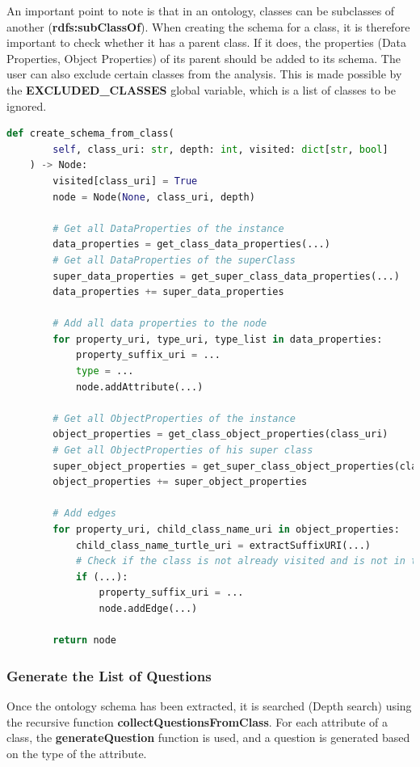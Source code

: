 An important point to note is that in an ontology, classes can be subclasses of another (\textbf{rdfs:subClassOf}). When creating the schema for a class, it is therefore important to check whether it has a parent class. If it does, the properties (Data Properties, Object Properties) of its parent should be added to its schema.
The user can also exclude certain classes from the analysis. This is made possible by the \textbf{EXCLUDED\_CLASSES} global variable, which is a list of classes to be ignored.\\

\begin{lstlisting}[language=Python, caption=Function to Create the Schema of the Ontology, label={lst:create-schema}]
def create_schema_from_class(
        self, class_uri: str, depth: int, visited: dict[str, bool]
    ) -> Node:
        visited[class_uri] = True
        node = Node(None, class_uri, depth)

        # Get all DataProperties of the instance
        data_properties = get_class_data_properties(...)
        # Get all DataProperties of the superClass
        super_data_properties = get_super_class_data_properties(...)
        data_properties += super_data_properties

        # Add all data properties to the node
        for property_uri, type_uri, type_list in data_properties:
            property_suffix_uri = ...
            type = ...
            node.addAttribute(...)

        # Get all ObjectProperties of the instance
        object_properties = get_class_object_properties(class_uri)
        # Get all ObjectProperties of his super class
        super_object_properties = get_super_class_object_properties(class_uri)
        object_properties += super_object_properties

        # Add edges
        for property_uri, child_class_name_uri in object_properties:
            child_class_name_turtle_uri = extractSuffixURI(...)
            # Check if the class is not already visited and is not in the list of excluded classes
            if (...):
                property_suffix_uri = ...
                node.addEdge(...)

        return node
\end{lstlisting}


\subsubsection{Generate the List of Questions}
Once the ontology schema has been extracted, it is searched (Depth search) using the recursive function \textbf{collectQuestionsFromClass}. For each attribute of a class, the \textbf{generateQuestion} function is used, and a question is generated based on the type of the attribute.

